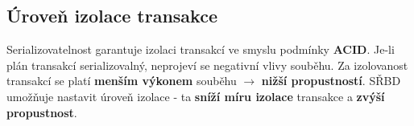\subsection{Úroveň izolace transakce}
Serializovatelnost garantuje izolaci transakcí ve smyslu podmínky \textbf{ACID}. Je-li plán transakcí serializovalný, neprojeví se negativní vlivy souběhu. Za izolovanost transakcí se platí \textbf{menším výkonem} souběhu $\rightarrow$ \textbf{nižší propustností}. SŘBD umožňuje nastavit úroveň izolace - ta \textbf{sníží míru izolace} transakce a \textbf{zvýší propustnost}.
\\\\
\noindent{}